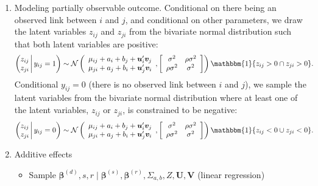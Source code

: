 \documentclass[a4paper, 12pt]{article}
\newcommand{\I}{\mathbbm{1}}
\begin{document}
\begin{enumerate}
  \item Modeling partially observable outcome. Conditional on there being an observed link between $i$ and $j$, and conditional on other parameters, we draw the latent variables $z_{ij}$ and $z_{ji}$ from the bivariate normal distribution such that both latent variables are positive:
\begin{align*}
\left(
\begin{matrix}
  z_{ij} \hfill \\   z_{ji}
\end{matrix}
\, \middle\vert \,
y_{ij} = 1
\right) & \sim \mathcal{N}
        \left ( \begin{array}{c}
         \mu_{ij} + a_i + b_j +    \bm{u}'_i\bm{v}_j  \\
         \mu_{ji} + a_j + b_i +  \bm{u}'_j\bm{v}_i \end{array}, \left [ \begin{array}{cc}
        \sigma^2 & \rho \sigma^2 \\
         \rho \sigma^2 & \sigma^2 \end{array} \right] \right )\I\{z_{ij} > 0 \cap z_{ji} > 0\}.
\end{align*}
Conditional $y_{ij} = 0$ (there is no observed link between $i$ and $j$), we sample the latent variables from the bivariate normal distribution where at least one of the latent variables, $z_{ij}$ or $z_{ji}$, is constrained to be negative:
\begin{align*}
\left(
\begin{matrix}
  z_{ij} \hfill \\   z_{ji}
\end{matrix}
\, \middle\vert \,
y_{ij} = 0
\right) & \sim \mathcal{N}
        \left ( \begin{array}{c}
         \mu_{ij} + a_i + b_j +    \bm{u}'_i\bm{v}_j  \\
         \mu_{ji} + a_j + b_i +  \bm{u}'_j\bm{v}_i \end{array}, \left [ \begin{array}{cc}
        \sigma^2 & \rho \sigma^2 \\
         \rho \sigma^2 & \sigma^2 \end{array} \right] \right )\I\{z_{ij} < 0 \cup z_{ji} < 0\}.
\end{align*}
  \item Additive effects
  \begin{itemize}
    \item Sample $\bm{\beta}^{(d)}, s, r \;|\; \bm{\beta}^{(s)}, \bm{\beta}^{(r)}, \Sigma_{a,b}, Z, \bm{U}, \bm{V}$ (linear regression)

\end{itemize}
\end{enumerate}
\end{document}
